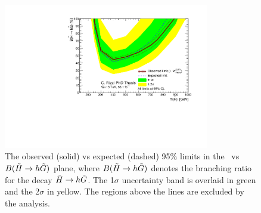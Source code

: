 \begin{figure}[htbp]
	\centering
	\includegraphics[width=0.8\textwidth]{figures/ewk_prod/interpretation/br_limit_HM.pdf}
	\caption{The observed (solid) vs expected (dashed) 95\% limits in the \mhino\ vs $B(\tilde{H}\rightarrow h \tilde{G})$ plane, where $B(\tilde{H}\rightarrow h \tilde{G})$ denotes the branching ratio for the decay $\tilde{H} \rightarrow h \tilde{G}$. The 1$\sigma$ uncertainty band is overlaid in green and the 2$\sigma$ in yellow. The regions above the lines are excluded by the analysis.} 
	\label{fig:exclusion_high:BR}
\end{figure}

\FloatBarrier

